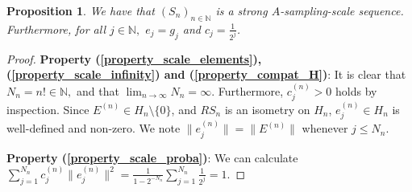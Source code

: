 \documentclass{amsart}
\newtheorem{prop}[thm]{Proposition}
\theoremstyle{definition}
\theoremstyle{remark}
\begin{document}



\begin{prop}
	We have that $(S_n)_{n\in\mathbb{N}}$ is a strong $A$-sampling-scale sequence. Furthermore, for all $j\in\mathbb{N},$  $e_j=g_j$ and $c_j=\frac{1}{2^j}$.
\end{prop}
\begin{proof}
	
	\textbf{Property (\ref{property_scale_elements}), (\ref{property_scale_infinity})  and (\ref{property_compat_H})}: It is clear that $N_n=n!\in\mathbb{N},$ and that $\lim_{n\rightarrow\infty} N_n=\infty.$ Furthermore, $c_j^{(n)}>0$  holds by inspection. Since $E^{(n)}\in H_n\setminus\{0\}$, and $RS_n$ is an isometry on $H_n$, $e_j^{(n)}\in H_n$ is well-defined and non-zero. We note $\|e_j^{(n)}\|=\|E^{(n)}\|$ whenever $j\leq N_n$.
	
	\textbf{Property (\ref{property_scale_proba})}: We can calculate $\sum_{j=1}^{N_n}c_j^{(n)}\|e_j^{(n)}\|^2=\frac{1}{1-2^{-N_n}}\sum_{j=1}^{N_n}\frac{1}{2^j}=1.$
	
	

\end{proof}
\end{document}
